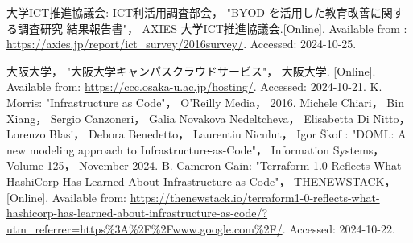 \documentclass[11pt]{ujarticle}\sloppy
\begin{document}
\begin{thebibliography}{99}
	大学ICT推進協議会: ICT利活用調査部会， "BYOD を活用した教育改善に関する調査研究 結果報告書"， AXIES 大学ICT推進協議会.[Online]. Available from : \url{https://axies.jp/report/ict_survey/2016survey/}. Accessed: 2024-10-25.

	大阪大学， "大阪大学キャンパスクラウドサービス"， 大阪大学. [Online]. Available from: \url{https://ccc.osaka-u.ac.jp/hosting/}. Accessed: 2024-10-21.
	K. Morris: "Infrastructure as Code"， O'Reilly Media， 2016.
	Michele Chiari， Bin Xiang， Sergio Canzoneri， Galia Novakova Nedeltcheva， Elisabetta Di Nitto， Lorenzo Blasi， Debora Benedetto， Laurentiu Niculut， Igor Škof : "DOML: A new modeling approach to Infrastructure-as-Code"， Information Systems， Volume 125， November 2024. 
	B. Cameron Gain: "Terraform 1.0 Reflects What HashiCorp Has Learned About Infrastructure-as-Code"， THENEWSTACK， [Online]. Available from: \url{https://thenewstack.io/terraform1-0-reflects-what-hashicorp-has-learned-about-infrastructure-as-code/?utm_referrer=https%3A%2F%2Fwww.google.com%2F/}. Accessed: 2024-10-22.
\end{thebibliography}
\end{document}
